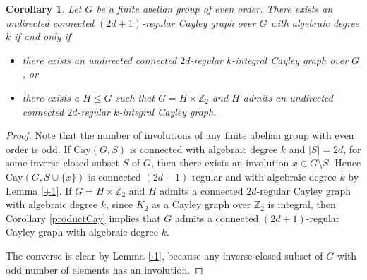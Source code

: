 \documentclass[12pt,a4paper]{article}
\newtheorem{core}[thm]{Corollary}
\def \leq {\leqslant}
\begin{document}
	\begin{core}\label{odd}
		Let $G$ be a finite abelian group of even order. There exists an undirected connected $(2d+1)$-regular Cayley graph over $G$ with algebraic degree $k$ if and only if 
		\begin{itemize}
			\item [$(1)$] there exists an undirected connected $2d$-regular $k$-integral Cayley graph over $G$, or
			\item [$(2)$] there exists a $H\leq G$ such that $G=H\times\mathbb Z_2$ and $H$ admits an undirected connected $2d$-regular $k$-integral Cayley graph.
		\end{itemize} 
	\end{core}
	\begin{proof}
		Note that the number of involutions of any finite abelian group with even order is odd.
		If $\mathrm{Cay}(G,S)$ is connected with algebraic degree $k$ and $|S|=2d$, for some inverse-closed subset $S$ of $G$, then there exists an involution $x\in G\setminus S$. Hence $\mathrm{Cay}(G,S\cup\{x\})$ is connected $(2d+1)$-regular and with algebraic degree $k$ by Lemma \ref{+1}.		
		If $G=H\times\mathbb Z_2$ and $H$ admits a connected $2d$-regular Cayley graph with algebraic degree $k$, since $K_2$ as a Cayley graph over $\mathbb Z_2$ is integral, then Corollary \ref{productCay} implies that $G$ admits a connected $(2d+1)$-regular Cayley graph with algebraic degree $k$.
		
		The converse is clear by Lemma \ref{-1}, because any inverse-closed subset of $G$ with odd number of elements has an involution.
	\end{proof}
	
	
\end{document}
